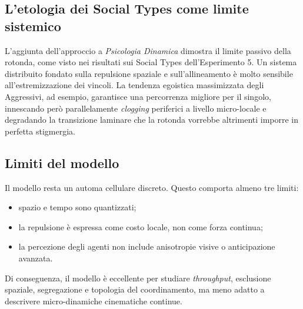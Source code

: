 \subsection{L'etologia dei Social Types come limite sistemico}
L'aggiunta dell'approccio a \textit{Psicologia Dinamica} dimostra il limite passivo della rotonda, come visto nei risultati sui Social Types dell'Esperimento 5. Un sistema distribuito fondato sulla repulsione spaziale e sull'allineamento è molto sensibile all'estremizzazione dei vincoli. La tendenza egoistica massimizzata degli Aggressivi, ad esempio, garantisce una percorrenza migliore per il singolo, innescando però parallelamente \textit{clogging} periferici a livello micro-locale e degradando la transizione laminare che la rotonda vorrebbe altrimenti imporre in perfetta stigmergia.

\subsection{Limiti del modello}
Il modello resta un automa cellulare discreto. Questo comporta almeno tre limiti:
\begin{itemize}
\item spazio e tempo sono quantizzati;
\item la repulsione è espressa come costo locale, non come forza continua;
\item la percezione degli agenti non include anisotropie visive o anticipazione avanzata.
\end{itemize}

Di conseguenza, il modello è eccellente per studiare \textit{throughput}, esclusione spaziale, segregazione e topologia del coordinamento, ma meno adatto a descrivere micro-dinamiche cinematiche continue.
